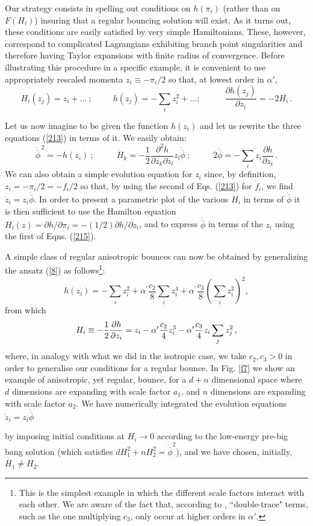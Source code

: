 \documentclass[a4paper,11pt]{article}
\def\beq{\begin{equation}}
\def\eeq{\end{equation}}
\def \pa {\partial}
\def \ra {\rightarrow}
\def \ap {\alpha^{\prime}}
\def \fb {\overline \phi}
\def \fbp {\dot{\fb}}
\def \fbpp {\ddot{\fb}}
\begin{document}
{ Our strategy consists in spelling out conditions on $h(\pi_i)$ (rather than on $F(H_i)$) insuring that a regular bouncing solution will exist. As it turns out, these conditions are easily satisfied by very simple Hamiltonians. These, however, correspond to complicated Lagrangians exhibiting branch point singularities and therefore having Taylor expansions with finite radius of convergence. 
Before illustrating this procedure  in a specific example, it is convenient to use appropriately rescaled momenta $z_i \equiv - {\pi_i}/{2}$ so that, at lowest order in $\alpha'$, 
\beq
H_i(z_j) = z_i + \dots ~;~~~~~~~~~~~ h(z_j) = -  \sum_i z_i^2 + \dots  ;~~~~~~~~~~~~~  \frac{\pa h(z_j)}{\pa z_i} = - 2 H_i \, .
\label{213a}
\eeq

Let us now imagine to be given the function $h(z_i)$ and let us rewrite the three equations (\ref{213}) in terms of it.
We easily obtain:
\beq
{\fbp}^{\,2} = - h(z_i)  ~;~~~~~~~~~~~~
 \dot{H}_k = - \frac12 \frac{\pa^2 h}{\pa z_k \pa z_l } z_l \fbp ~;~~~~~~~~~~~~   2 \fbpp =  - \sum_i  z_i \frac{\pa h}{\pa z_i} \, .
\label{215}
\eeq
We can also obtain a simple evolution equation for $z_i$ since, by definition, $z_i= - \pi_i/2= -f_i/2$ so that, by using the second of Eqs. (\ref{213}) for $\dot f_i$, we find $\dot z_i= z_i \fbp$. 
In order to present a parametric plot of the various $H_i$ in terms of $\fbp$ it is then sufficient to use the Hamilton equation $H_i(z)= \pa h/\pa \pi_i= -(1/2) \pa h/ \pa z_i$, and to express $\fbp$ in terms of the $z_i$ using the first of Eqns. (\ref{215}).  


A simple class of regular anisotropic bounces can now be obtained by generalizing the ansatz (\ref{8}) as follows\footnote{This is the simplest example in which the different scale factors interact with each other. We are aware of the fact that, according to \cite{1},  ``double-trace" terms, such as the one multiplying $c_3$, only occur at higher orders in $\alpha'$.}:
\beq
h( z_i) =  - \sum_i z_i^2  + \ap \frac{c_2}{8}  \sum_i z_i^4 + \ap  \frac{c_3}{8}  \left(\sum_i z_i^2\right)^2 ,
\eeq 
from which
\beq
 H_i   \equiv -{1\over 2} {\pa h\over \pa z_i}
=  z_i  - \ap \frac{c_2}{4}  z_i^3 -  \ap \frac{c_3}{4}  z_i \sum_j z_j^2 \, ,
\label{216}
\eeq
where, in analogy with what we did in the isotropic case, we take $c_2, c_3 >0$ in order to generalise our conditions for a regular bounce.
In Fig. \ref{f7} we show an example of anisotropic, yet regular, bounce,
for a $d+n$ dimensional space where $d$ dimensions are expanding with scale factor $a_1$, and $n$ dimensions are expanding with scale factor $a_2$. We have numerically integrated the evolution equations $\dot z_i= z_i \fbp$} by imposing initial conditions at $ H_i \ra 0$ according to the low-energy pre-big bang solution (which satisfies $d H_1^2 + n H_2^2 = \fbp^2$), and we have chosen, initially, $H_1 \not= H_2$.
\end{document}
